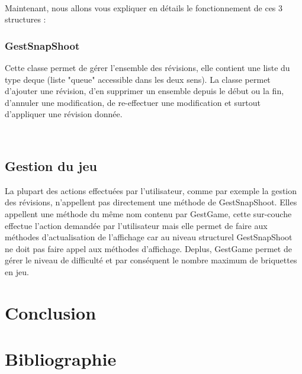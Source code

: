 \documentclass[frenchb,twoside]{EPURapport}
\begin{document}
		\
		
		Maintenant, nous allons vous expliquer en détails le fonctionnement de
		ces 3 structures :
		
			\subsection{GestSnapShoot}
			Cette classe permet de gérer l'ensemble des révisions, elle contient
			une liste du type deque (liste "queue" accessible dans les deux sens).
			La classe permet d'ajouter une révision, d'en supprimer un ensemble depuis
			le début ou la fin, d'annuler une modification, de re-effectuer une modification
			 et surtout d'appliquer une révision donnée.
			 
			 \
			 
        

    \section{Gestion du jeu}
    
		La plupart des actions effectuées par l'utilisateur, comme par exemple la gestion
		des révisions, n'appellent pas directement une méthode de GestSnapShoot. Elles appellent
		une méthode du même nom contenu par GestGame, cette sur-couche effectue l'action demandée
		par l'utilisateur mais elle permet de faire aux méthodes d'actualisation de l'affichage
		car au niveau structurel GestSnapShoot ne doit pas faire appel aux méthodes d'affichage.
		Deplus, GestGame permet de gérer le niveau de difficulté et par conséquent le nombre maximum
		de briquettes en jeu.
			 
        
\chapter{Conclusion}




\chapter{Bibliographie}
\end{document}
